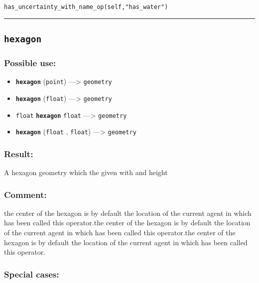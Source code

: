 \documentclass[]{book}
\providecommand{\tightlist}{%
  \setlength{\itemsep}{0pt}\setlength{\parskip}{0pt}}
\theoremstyle{definition}
\theoremstyle{definition}
\theoremstyle{definition}
\theoremstyle{remark}
\begin{document}
\begin{verbatim}
has_uncertainty_with_name_op(self,"has_water") 
\end{verbatim}

\begin{center}\rule{0.5\linewidth}{\linethickness}\end{center}

\subsection{\texorpdfstring{\texttt{hexagon}}{hexagon}}\label{hexagon}

\subsubsection{Possible use:}\label{possible-use-258}

\begin{itemize}
\tightlist
\item
  \textbf{\texttt{hexagon}} (\texttt{point}) ---\textgreater{}
  \texttt{geometry}
\item
  \textbf{\texttt{hexagon}} (\texttt{float}) ---\textgreater{}
  \texttt{geometry}
\item
  \texttt{float} \textbf{\texttt{hexagon}} \texttt{float}
  ---\textgreater{} \texttt{geometry}
\item
  \textbf{\texttt{hexagon}} (\texttt{float} , \texttt{float})
  ---\textgreater{} \texttt{geometry}
\end{itemize}

\subsubsection{Result:}\label{result-249}

A hexagon geometry which the given with and height

\subsubsection{Comment:}\label{comment-48}

the center of the hexagon is by default the location of the current
agent in which has been called this operator.the center of the hexagon
is by default the location of the current agent in which has been called
this operator.the center of the hexagon is by default the location of
the current agent in which has been called this operator.

\subsubsection{Special cases:}\label{special-cases-75}
\end{document}
